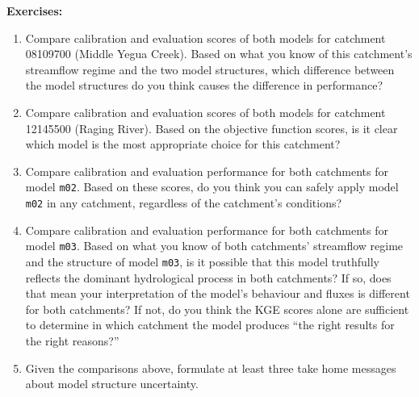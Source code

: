 \documentclass[12pt]{article}
\begin{document}
\medskip \noindent
\textbf{Exercises:}
\begin{enumerate}
	\item Compare calibration and evaluation scores of both models for catchment 08109700 (Middle Yegua Creek). Based on what you know of this catchment's streamflow regime and the two model structures, which difference between the model structures do you think causes the difference in performance?
	\item Compare calibration and evaluation scores of both models  for catchment 12145500 (Raging River). Based on the objective function scores, is it clear which model is the most appropriate choice for this catchment?
	\item Compare calibration and evaluation performance for both catchments for model \texttt{m02}. Based on these scores, do you think you can safely apply model \texttt{m02} in any catchment, regardless of the catchment's conditions?
	\item Compare calibration and evaluation performance for both catchments for model \texttt{m03}. Based on what you know of both catchments' streamflow regime and the structure of model \texttt{m03}, is it possible that this model truthfully reflects the dominant hydrological process in both catchments? If so, does that mean your interpretation of the model's behaviour and fluxes is different for both catchments? If not, do you think the KGE scores alone are sufficient to determine in which catchment the model produces ``the right results for the right reasons?''
	\item Given the comparisons above, formulate at least three take home messages about model structure uncertainty.
\end{enumerate}



\end{document}
